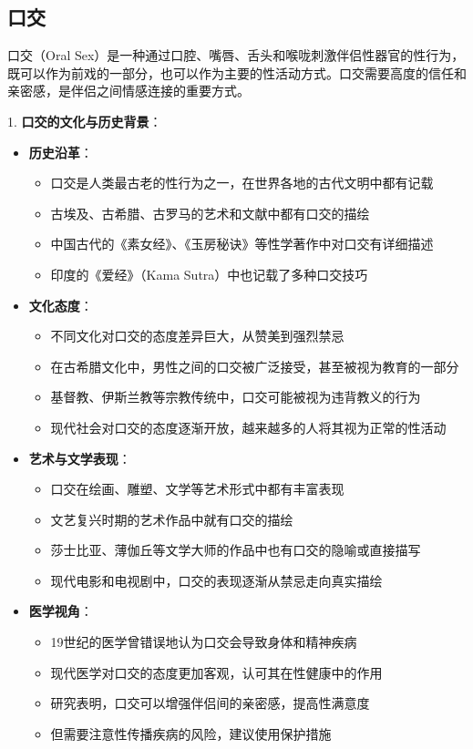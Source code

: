 \documentclass[12pt,UTF8]{ctexbook}
\begin{document}
\subsection{口交}

口交（Oral Sex）是一种通过口腔、嘴唇、舌头和喉咙刺激伴侣性器官的性行为，既可以作为前戏的一部分，也可以作为主要的性活动方式。口交需要高度的信任和亲密感，是伴侣之间情感连接的重要方式。

1. \textbf{口交的文化与历史背景}：
\begin{itemize}
	\item \textbf{历史沿革}：
	\begin{itemize}
		\item 口交是人类最古老的性行为之一，在世界各地的古代文明中都有记载
		\item 古埃及、古希腊、古罗马的艺术和文献中都有口交的描绘
		\item 中国古代的《素女经》、《玉房秘诀》等性学著作中对口交有详细描述
		\item 印度的《爱经》（Kama Sutra）中也记载了多种口交技巧
	\end{itemize}
	\item \textbf{文化态度}：
	\begin{itemize}
		\item 不同文化对口交的态度差异巨大，从赞美到强烈禁忌
		\item 在古希腊文化中，男性之间的口交被广泛接受，甚至被视为教育的一部分
		\item 基督教、伊斯兰教等宗教传统中，口交可能被视为违背教义的行为
		\item 现代社会对口交的态度逐渐开放，越来越多的人将其视为正常的性活动
	\end{itemize}
	\item \textbf{艺术与文学表现}：
	\begin{itemize}
		\item 口交在绘画、雕塑、文学等艺术形式中都有丰富表现
		\item 文艺复兴时期的艺术作品中就有口交的描绘
		\item 莎士比亚、薄伽丘等文学大师的作品中也有口交的隐喻或直接描写
		\item 现代电影和电视剧中，口交的表现逐渐从禁忌走向真实描绘
	\end{itemize}
	\item \textbf{医学视角}：
	\begin{itemize}
		\item 19世纪的医学曾错误地认为口交会导致身体和精神疾病
		\item 现代医学对口交的态度更加客观，认可其在性健康中的作用
		\item 研究表明，口交可以增强伴侣间的亲密感，提高性满意度
		\item 但需要注意性传播疾病的风险，建议使用保护措施
	\end{itemize}
\end{itemize}
\end{document}
